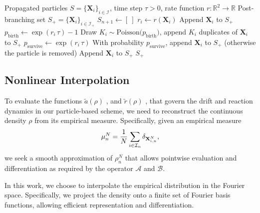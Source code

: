 \documentclass[a4paper,fleqn]{cas-sc}
\theoremstyle{definition}
\theoremstyle{remark}
\begin{document}
\begin{algorithm}
\caption{Birth--Death Step}\label{alg:birthdeath}
\begin{algorithmic}
\Require Propagated particles $S=\{\mathbf X_{i}\}_{i\in\mathcal I}$, time step $\tau>0$, rate function $r:\mathbb R^2\to\mathbb R$
\Ensure Post-branching set $S_{+}=\{\mathbf X_{i}\}_{i\in\mathcal I_{+}}$
    \State $S_{n+1}\gets [\ ]$
        \State $r_i \gets r(\mathbf X_{i})$
         
            \State Append $\mathbf X_{i}$ to $S_{+}$ 
            \State $p_{\mathrm{birth}} \gets \exp(r_i\,\tau) - 1$
            \State Draw $K_i \sim \mathrm{Poisson}\!\big(p_{\mathrm{birth}}\big)$, append $K_i$ duplicates of $\mathbf X_{i}$ to $S_{+}$
         
            \State $p_{\mathrm{survive}}\gets \exp(r_i\,\tau)$ 
            \State With probability $p_{\mathrm{survive}}$, append $\mathbf X_{i}$ to $S_{+}$
            \State \quad (otherwise the particle is removed)
        \Else {}
            \State Append $\mathbf X_{i}$ to $S_{+}$
        \EndIf
    \EndFor
    \State \Return $S_{+}$
\EndProcedure
\end{algorithmic}
\end{algorithm}




\subsection{Nonlinear Interpolation}
\label{sec:interpolation}
To evaluate the functions $\tilde a(\rho)$ , and $\tilde r(\rho)$ , that govern the drift and reaction dynamics in our particle-based scheme, we need to reconstruct the continuous density 
$\rho$ from its empirical measure. Specifically, given an empirical measure
\[
\mu^N_n= \frac{1}{N}\sum_{i\in \mathcal I_n}\delta_{\mathbf{X}_{i,n}^N},
\] 
we seek a smooth approximation of $\rho^N_n$ that allows pointwise evaluation and differentiation as required by the operator $\mathcal{A}$ and $\mathcal{B}$.

In this work, we choose to interpolate the empirical distribution in the Fourier space. Specifically, we project the density onto a finite set of Fourier basis functions, allowing efficient representation and differentiation. 
\end{document}
